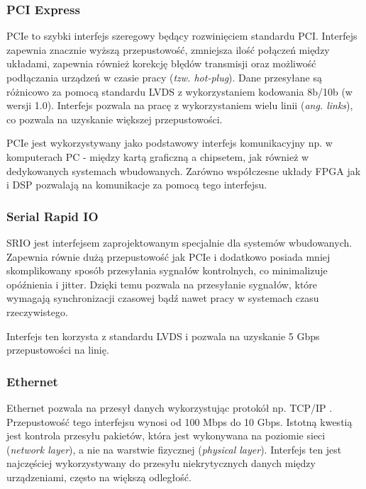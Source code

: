 \subsubsection{PCI Express} 
PCIe to szybki interfejs szeregowy będący rozwinięciem standardu PCI. Interfejs zapewnia znacznie wyższą przepustowość, zmniejsza ilość połączeń między układami, zapewnia również korekcję błędów transmisji oraz możliwość podłączania urządzeń w czasie pracy (\textit{tzw. hot-plug}). Dane przesyłane są różnicowo za pomocą standardu LVDS z wykorzystaniem kodowania 8b/10b \cite{8B_10B} (w wersji 1.0). Interfejs pozwala na pracę z wykorzystaniem wielu linii (\textit{ang. links}), co pozwala na uzyskanie większej przepustowości. 

 PCIe jest wykorzystywany jako podstawowy interfejs komunikacyjny np. w komputerach PC - między kartą graficzną a chipsetem, jak również w dedykowanych systemach wbudowanych. Zarówno współczesne układy FPGA jak i DSP pozwalają na komunikacje za pomocą tego interfejsu.  
%
%

\subsubsection{Serial Rapid IO}
SRIO jest interfejsem zaprojektowanym specjalnie dla systemów wbudowanych. Zapewnia równie dużą przepustowość jak PCIe i dodatkowo posiada mniej skomplikowany sposób przesyłania sygnałów kontrolnych, co minimalizuje opóźnienia i jitter. Dzięki temu pozwala na przesyłanie sygnałów, które wymagają synchronizacji czasowej bądź nawet pracy w systemach czasu rzeczywistego. 

Interfejs ten korzysta z standardu LVDS i pozwala na uzyskanie 5 Gbps przepustowości na linię. 

\subsubsection{Ethernet}
Ethernet pozwala na przesył danych wykorzystując protokół np. TCP/IP \cite{TCP}. Przepustowość tego interfejsu wynosi od 100 Mbps do 10 Gbps. Istotną kwestią jest kontrola przesyłu pakietów, która jest wykonywana na poziomie sieci (\textit{network layer}), a nie na warstwie fizycznej (\textit{physical layer}). Interfejs ten jest najczęściej wykorzystywany do przesyłu niekrytycznych danych między urządzeniami, często na większą odległość. 


